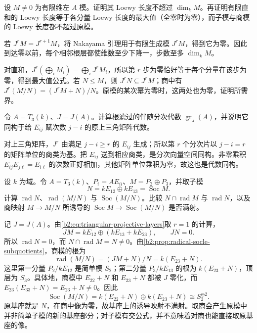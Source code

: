 \begin{exercise}\label{b2:ex:15-loewy-length-bounds}
	设 \(M\ne0\) 为有限维左 \(A\) 模。证明其 Loewy 长度不超过 \(\dim_kM\)。再证明有限直和的 Loewy 长度等于各分量 Loewy 长度的最大值（全零时为零），而子模与商模的 Loewy 长度都不超过原模。
\end{exercise}
\begin{solution}
	若 \(J^rM=J^{r+1}M\)，将 Nakayama 引理用于有限生成模 \(J^rM\)，得到它为零。因此到达零以前，每个相邻根层都使维数至少下降一，步数至多 \(\dim_kM\)。

	对直和，\(J^r(\bigoplus_iM_i)=\bigoplus_iJ^rM_i\)，所以第 \(r\) 步为零恰好等于每个分量在该步为零，得到最大值公式。若 \(N\le M\)，则 \(J^rN\subseteq J^rM\)；商中有 \(J^r(M/N)=(J^rM+N)/N\)。原模的某次幂为零时，这两处也为零，证明所需界。
\end{solution}

\begin{exercise}\label{b2:ex:15-associated-radical-algebra}
	令 \(A=T_3(k)\)、\(J=J(A)\)。计算根滤过的伴随分次代数 \(\operatorname{gr}_J(A)\)，并说明它同构于给 \(E_{ij}\) 赋次数 \(j-i\) 的原上三角矩阵代数。
\end{exercise}
\begin{solution}
	对上三角矩阵，\(J^r\) 由满足 \(j-i\ge r\) 的 \(E_{ij}\) 生成；所以第 \(r\) 个分次片以 \(j-i=r\) 的矩阵单位的商类为基。把 \(E_{ij}\) 送到相应商类，是分次向量空间同构。非零乘积 \(E_{ij}E_{j\ell}=E_{i\ell}\) 的次数正好相加，其他矩阵单位乘积为零，故这也是代数同构。
\end{solution}

\begin{exercise}\label{b2:ex:15-radical-socle-subquotient}
	设 \(k\) 为域。令 \(A=T_3(k)\)、\(P_i=AE_{ii}\)、\(M=P_2\oplus P_3\)，并取子模
	\[
		N=kE_{12}\oplus kE_{13}=\operatorname{Soc}M.
	\]
	计算 \(\operatorname{rad}N\)、\(\operatorname{rad}(M/N)\) 与 \(\operatorname{Soc}(M/N)\)。比较 \(N\cap\operatorname{rad}M\) 与 \(\operatorname{rad}N\)，以及商映射 \(M\to M/N\) 所诱导的 \(\operatorname{Soc}M\to\operatorname{Soc}(M/N)\) 是否满射。
\end{exercise}
\begin{solution}
	记 \(J=J(A)\)。由\eqref{b2:eq:triangular-projective-layers}取 \(r=1\) 的计算，
	\[
		JM=kE_{12}\oplus(kE_{13}+kE_{23}),\qquad JN=0.
	\]
	所以 \(\operatorname{rad}N=0\)，而 \(N\cap\operatorname{rad}M=N\ne0\)。由\cref{b2:prop:radical-socle-subquotients}，商模的根为
	\[
		\operatorname{rad}(M/N)=(JM+N)/N=k(E_{23}+N).
	\]
	这里第一分量 \(P_2/kE_{12}\) 是简单模 \(S_2\)；第二分量 \(P_3/kE_{13}\) 的根为 \(k(E_{23}+N)\)，顶层为 \(S_3\)。具体地，商模中 \(E_{22}+N\) 和 \(E_{23}+N\) 都被 \(J\) 零化，而 \(E_{23}(E_{33}+N)=E_{23}+N\ne0\)。因此
	\[
		\operatorname{Soc}(M/N)=k(E_{22}+N)\oplus k(E_{23}+N)\cong S_2^{\oplus2}.
	\]
	原基座就是 \(N\)，在商中像为零，故基座上的诱导映射不满射。取商会产生原模中并非简单子模的新的基座部分；对子模有交公式，并不意味着对商也能直接取原基座的像。
\end{solution}

